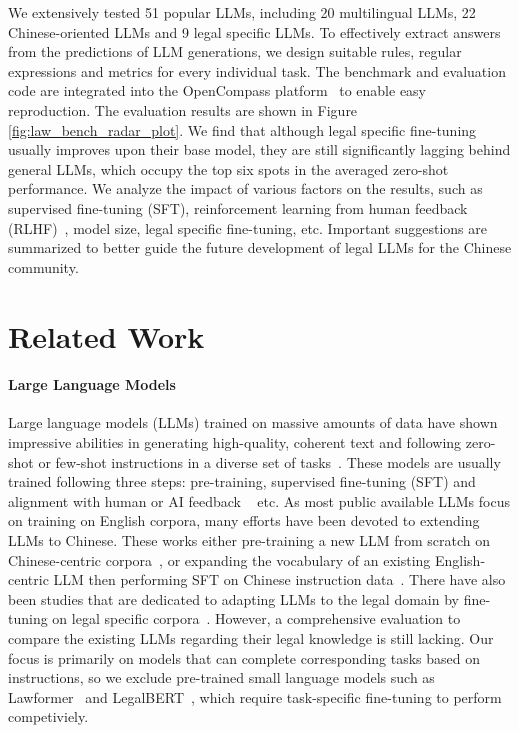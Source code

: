 We extensively tested 51 popular LLMs,  including 20 multilingual LLMs, 22 Chinese-oriented LLMs and 9 legal specific LLMs. To effectively extract answers from the predictions of LLM generations, we design suitable rules, regular expressions and metrics for every individual task. The benchmark and evaluation code are integrated into the OpenCompass platform~\cite{2023opencompass} to enable easy reproduction. The evaluation results are shown in Figure \ref{fig:law_bench_radar_plot}. We find that although legal specific fine-tuning usually improves upon their base model, they are still significantly lagging behind general LLMs, which occupy the top six spots in the averaged zero-shot performance. We analyze the impact of various factors on the results, such as supervised fine-tuning (SFT), reinforcement learning from human feedback (RLHF)~\cite{christiano2017deep}, model size, legal specific fine-tuning, etc. Important suggestions are summarized to better guide the future development of legal LLMs for the Chinese community.

\section{Related Work}
\paragraph{Large Language Models}
Large language models (LLMs) trained on massive amounts of data have shown impressive abilities in generating high-quality, coherent text and following zero-shot or few-shot instructions in a diverse set of tasks~\cite{openai_chatgpt,openai2023gpt4,chowdhery2022palm,touvron2023llama1,touvron2023llama}. These models are usually trained following three steps: pre-training, supervised fine-tuning (SFT) and alignment with human or AI feedback ~\cite{christiano2017deep,shen2017estimation,wei2021finetuned,ouyang2022training,lee2023rlaif,casper2023open} etc. As most public available LLMs focus on training on English corpora, many efforts have been devoted to extending LLMs to Chinese. These works either pre-training a new LLM from scratch on Chinese-centric corpora~\cite{su2022welm,zeng2022glm,du2022glm,sun2023moss,2023internlm}, or expanding the vocabulary of an existing English-centric LLM then performing SFT on Chinese instruction data~\cite{chinese-llama-alpaca,BELLE,belle2023exploring}. 
There have also been studies that are dedicated to adapting LLMs to the legal domain by fine-tuning on legal specific corpora~\cite{cui2023chatlaw,huang2023lawyer,yue2023disclawllm}. However, a comprehensive evaluation to compare the existing LLMs regarding their legal knowledge is still lacking. Our focus is primarily on models that can complete corresponding tasks based on instructions, so we exclude pre-trained small language models such as Lawformer~\cite{xiao2021lawformer} and LegalBERT~\cite{chalkidis2020legal}, which require task-specific fine-tuning to perform competiviely. 

